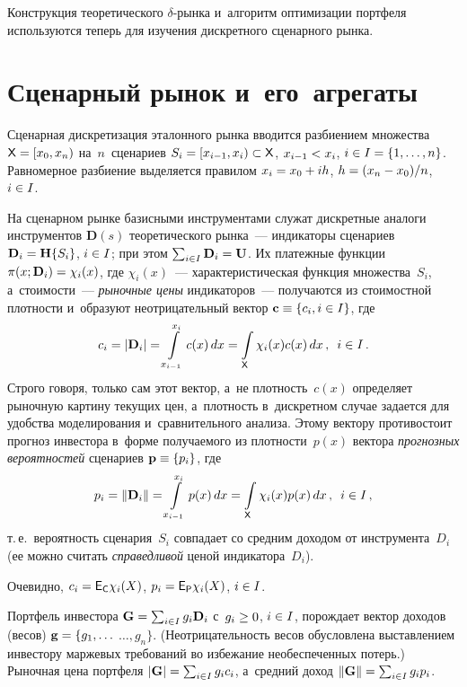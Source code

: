 \begin{multicols}{2}
  Конструкция теоретического $\delta$-рын\-ка и~алгоритм оптимизации 
портфеля используются теперь для изучения дискретного сценарного рынка. 
   
  \section{Сценарный рынок и~его~агрегаты}
  
  Сценарная дискретизация эталонного рынка вводится разбиением множества 
${\sf X}\hm=[x_0, x_n)$ на~$n$~сценариев $S_i\hm=[x_{i-1}, x_i)\hm\subset {\sf X}$, 
$x_{i-1}\hm< x_i$, $i\hm\in I\hm= \{1,\ldots , n\}$. Равномерное разбиение 
выделяется правилом $x_i \hm=x_0 \hm+ ih$, $h\hm=(x_n\hm- x_0)/n$, $i\hm\in I$. 
  
  На сценарном рынке базисными инструментами служат дискретные аналоги 
инструментов $\mathbf{D}(s)$ теоретического рынка~--- индикаторы сценариев 
$\mathbf{D}_i\hm=\mathbf{H}\{S_i\}$, $i\hm\in I$; при этом $\sum\nolimits_{i\in I} 
\mathbf{D}_i\hm=\mathbf{U}$. Их 
платежные функции $\pi(x;\mathbf{D}_i)\hm=\chi_i(x)$, где $\chi_i(x)$~--- 
характеристическая функция множества~$S_i$, а~стоимости~--- 
\textit{рыночные цены} индикаторов~--- получаются из стоимостной плотности 
и~образуют неотрицательный вектор $\mathbf{c}\hm\equiv \{c_i, i\hm\in I\}$, 
где
  $$
  c_i=\left\vert \mathbf{D}_i\right\vert =\int\limits_{x_{i-1}}^{x_i} c(x)\,dx=\int\limits_{\sf 
X} \chi_i(x) c(x)\,dx\,,\enskip i\in I\,.
  $$
    Строго говоря, только сам этот вектор, а~не плот\-ность~$c(x)$ определяет 
рыночную картину текущих цен, а~плот\-ность в~дискретном случае задается 
для удобства моделирования и~сравнительного анализа. Этому вектору 
противостоит прогноз инвестора в~форме получаемого из плотности~$p(x)$ 
вектора \textit{прогнозных вероятностей} сценариев $\mathbf{p}\hm\equiv 
\{p_i\}$, где 
  $$
  p_i=\left\| \mathbf{D}_i\right\| =\int\limits^{x_i}_{x_{i-1}} p(x)\,dx =\int\limits_{\sf X} 
\chi_i(x) p(x)\,dx\,,\enskip i\in I\,,
  $$
т.\,е.\ вероятность сценария~$S_i$ совпадает со средним доходом от 
инструмента~$D_i$ (ее можно считать \textit{справедливой} ценой 
индикатора~$D_i$). 

  Очевидно, $c_i={\sf E}_{\sf C} \chi_i(X)$, $p_i\hm={\sf E}_{\sf P}\chi_i(X)$, 
$i\hm\in I$.
  
  Портфель инвестора $\mathbf{G}\hm=\sum\nolimits_{i\in I} g_i \mathbf{D}_i$ 
  с~$g_i\hm\geq 0$, 
$i\hm\in I$, порождает вектор доходов (весов) $\mathbf{g}\hm= \{g_1,\ldots$\linebreak
$\ldots , 
g_n\}$. (Неотрицательность весов обуслов\-ле\-на выставлением инвестору 
маржевых требований во избежание необеспеченных потерь.) Рыночная цена 
портфеля $\vert \mathbf{G}\vert \hm= \sum\nolimits_{i\in I} g_i c_i$, а~средний 
доход $\| \mathbf{G}\| \hm= \sum\nolimits_{i\in I} g_i p_i$. 
  

\end{multicols}
